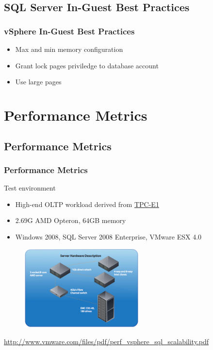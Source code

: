 \documentclass[CJK]{beamer}
\begin{document}
\subsection{SQL Server In-Guest Best Practices}
\begin{frame}[t]
    \frametitle{vSphere In-Guest Best Practices}
    \begin{itemize}
        \item Max and min memory configuration
        \item Grant lock pages priviledge to database account
        \item Use large pages
    \end{itemize}
\end{frame}

\section{Performance Metrics}
\subsection{Performance Metrics}
\begin{frame}[t]
    \frametitle{Performance Metrics}
    Test environment
    \begin{itemize}
        \item High-end OLTP workload derived from \href{http://www.tpc.org/tpce/default.asp}{TPC-E1}
        \item 2.69G AMD Opteron, 64GB memory
        \item Windows 2008, SQL Server 2008 Enterprise, VMware ESX 4.0
    \end{itemize}
    \begin{figure}[b]
        \includegraphics[width=180pt]{"test_environment_hw.png"}
    \end{figure}
    \url{http://www.vmware.com/files/pdf/perf_vsphere_sql_scalability.pdf}
\end{frame}
\end{document}
